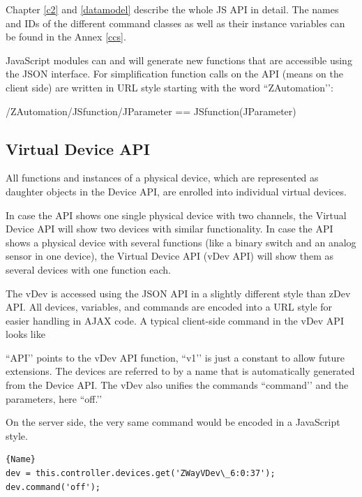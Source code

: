 Chapter \ref{c2} and \ref{datamodel} describe the whole JS API in detail. The 
names and IDs of the different command classes as well as their instance variables 
can be found in the Annex \ref{ccs}.

JavaScript modules can and will generate new functions that are accessible using the 
JSON interface. For simplification function calls on the API (means on the client side) 
are written in URL style starting with the word ``ZAutomation’’:


\begin{center}
/ZAutomation/JSfunction/JParameter
== JSfunction(JParameter)
\end{center}

\subsection{Virtual Device API}

All functions and instances of a physical device, which are represented as daughter objects
in the \zwave Device API, are enrolled into individual virtual devices.

In case the \zwave API shows one single physical device with two channels, the Virtual 
Device API will show two devices with similar functionality. In case the \zwave API shows 
a physical device with several functions (like a binary switch and an analog sensor in 
one device), the Virtual Device API (vDev API) will show them as several devices with 
one function each.

The vDev is accessed using the JSON API in a slightly different style than zDev API. 
All devices, variables, and commands are encoded into a URL style for easier handling 
in AJAX code. A typical client-side command in the vDev API looks like




``API’’ points to the vDev API function, ``v1’’ is just a constant to allow future extensions. 
The devices are referred to by a name that is automatically generated from the \zwave Device 
API. The vDev also unifies the commands ``command’’ and the parameters, here ``off.’’

On the server side, the very same command would be encoded in a JavaScript style.

\begin{lstlisting}[caption=Bind a function, basicstyle=\small]{Name}
dev = this.controller.devices.get('ZWayVDev\_6:0:37');
dev.command('off');
\end{lstlisting}

